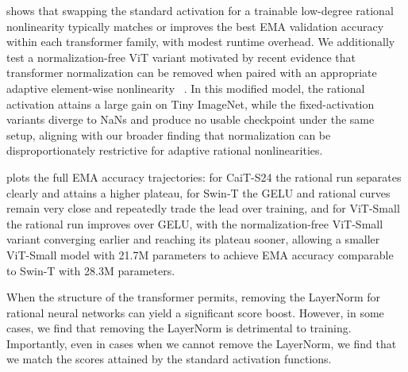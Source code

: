 \documentclass{article}
\theoremstyle{plain}
\theoremstyle{definition}
\theoremstyle{remark}
\begin{document}
 shows that swapping the standard activation for a trainable low-degree rational nonlinearity typically matches or improves the best EMA validation accuracy within each transformer family, with modest runtime overhead.  {We additionally test a normalization-free ViT variant motivated by recent evidence that transformer normalization can be removed when paired with an appropriate adaptive element-wise nonlinearity}~\cite{zhu2025transformerswithoutnorm} {. In this modified model, the rational activation attains a large gain on Tiny ImageNet, while the fixed-activation variants diverge to NaNs and produce no usable checkpoint under the same setup, aligning with our broader finding that normalization can be disproportionately restrictive for adaptive rational nonlinearities.}

 { plots the full EMA accuracy trajectories: for CaiT-S24 the rational run separates clearly and attains a higher plateau, for Swin-T the GELU and rational curves remain very close and repeatedly trade the lead over training, and for ViT-Small the rational run improves over GELU, with the normalization-free ViT-Small variant converging earlier and reaching its plateau sooner, allowing a smaller ViT-Small model with 21.7M parameters to achieve EMA accuracy comparable to Swin-T with 28.3M parameters.}

When the structure of the transformer permits, removing the LayerNorm for rational neural networks can yield a significant score boost. However, in some cases, we find that removing the LayerNorm is detrimental to training. Importantly, even in cases when we cannot remove the LayerNorm, we find that we match the scores attained by the standard activation functions. 
\end{document}
